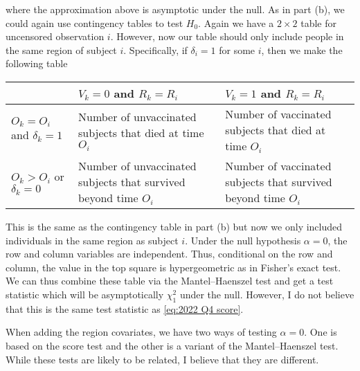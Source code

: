 \begin{enumerate}[label=(\alph*)]
    where the approximation above is asymptotic under the null.  As in part (b), we could again use contingency tables to test $H_0$. Again we have a $2 \times 2$ table for uncensored observation $i$. However, now our table should only include people in the same region of subject $i$. Specifically, if $\delta_i=1$ for some $i$, then we make the following table
    \begin{table}[h]
        \begin{center}
        \begin{tabular}{|p{2.5cm}|p{5cm}|p{5cm}|}
            \hline
         &$V_k=0$ and $R_k=R_i$ & $V_k=1$ and $R_k=R_i$ \\
         \hline 
        $O_k=O_i$ and $\delta_k=1$ & Number of unvaccinated subjects that died at time $O_i$ & Number of vaccinated subjects that died at time $O_i$\\ 
        \hline 
        $O_k > O_i$ or $\delta_k = 0$& Number of unvaccinated subjects that survived beyond time $O_i$ & Number of vaccinated subjects that survived beyond time $O_i$ \\
        \hline 
        \end{tabular}
    \end{center}
    \end{table}
    This is the same as the contingency table in part (b) but now we only included individuals in the same region as subject $i$. Under the null hypothesis $\alpha = 0$, the row and column variables are independent. Thus, conditional on the row and column, the value in the top square is hypergeometric as in Fisher's exact test. We can thus combine these table via the Mantel--Haenszel test and get a test statistic which will be asymptotically $\chi^2_1$ under the null. However, I do not believe that this is the same test statistic as \eqref{eq:2022 Q4 score}.
    
    When adding the region covariates, we have two ways of testing $\alpha = 0$. One is based on the score test and the other is a variant of the Mantel--Haenszel test. While these tests are likely to be related, I believe that they are different. 
\end{enumerate}

